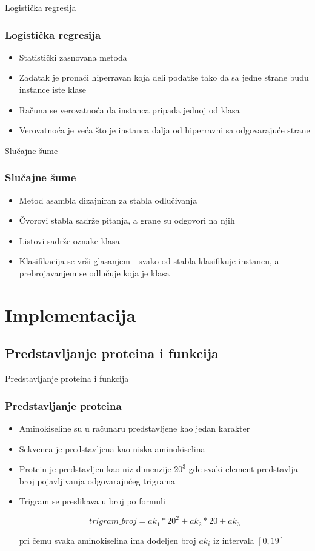 \documentclass{beamer}
\begin{document}
\begin{frame}{Logistička regresija}
	\frametitle{Logistička regresija}
	
	\begin{itemize}
		\item Statistički zasnovana metoda
		\item Zadatak je pronaći hiperravan koja deli podatke tako da sa jedne strane budu instance iste klase
		\item Računa se verovatnoća da instanca pripada jednoj od klasa 
		\item Verovatnoća je veća što je instanca dalja od hiperravni sa odgovarajuće strane
	\end{itemize}
\end{frame}

 
 
\begin{frame}{Slučajne šume}
	\frametitle{Slučajne šume}
	
	\begin{itemize}
		\item Metod asambla dizajniran za stabla odlučivanja
		\item Čvorovi stabla sadrže pitanja, a grane su odgovori na njih
		\item Listovi sadrže oznake klasa
		\item Klasifikacija se vrši glasanjem - svako od stabla klasifikuje instancu, a prebrojavanjem se odlučuje koja je klasa
	\end{itemize}
\end{frame}


\section{Implementacija}
\subsection{Predstavljanje proteina i funkcija}
\begin{frame}{Predstavljanje proteina i funkcija}
	\frametitle{Predstavljanje proteina}
	\begin{itemize}
		\item Aminokiseline su u računaru predstavljene kao jedan karakter 
		\item Sekvenca je predstavljena kao niska aminokiselina
		\item Protein je predstavljen kao niz dimenzije $20^3$ gde svaki element predstavlja broj pojavljivanja odgovarajućeg trigrama
		\item Trigram se preslikava u broj po formuli 
		
		$$trigram\_broj = ak_1 * 20^2 + ak_2 * 20 + ak_3$$
		
		pri čemu svaka aminokiselina ima dodeljen broj $ak_i$ iz intervala $[0, 19]$
	\end{itemize}
\end{frame}
\end{document}
